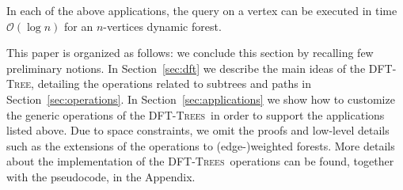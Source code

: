 \documentclass[a4paper,USenglish]{lipics}
\newcommand{\bigoh}{\mathcal{O}}
\newcommand{\dft}{\textsc{DFT-Tree}}
\newcommand{\dfts}{\textsc{DFT-Trees}}
\begin{document}
In each of the above applications, the query on a vertex  can be executed in time $\bigoh ( \log n)$ for an $n$-vertices dynamic forest.



This paper is organized as follows: we conclude this section by recalling few preliminary notions. In Section~\ref{sec:dft} we describe the main ideas of the \dft, detailing the operations related to subtrees and paths in Section~\ref{sec:operations}. In Section~\ref{sec:applications} we show how to customize the generic operations of the \dfts\ in order to support the applications listed above.  Due to space constraints, we omit the proofs and low-level details such as the extensions of the operations to (edge-)weighted forests. More details about the implementation of the \dfts\ operations can be found, together with the pseudocode, in the Appendix. 
\end{document}
